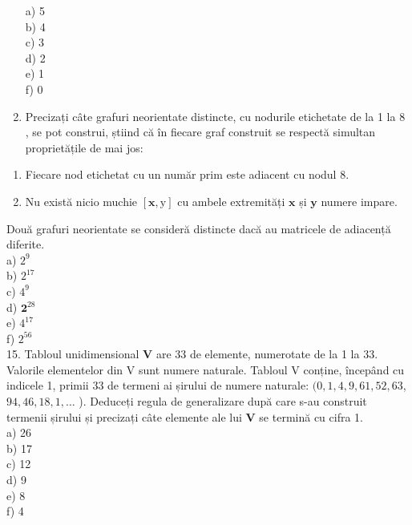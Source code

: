 \begin{enumerate}
a) 5\\
b) 4\\
c) 3\\
d) 2\\
e) 1\\
f) 0
  \item Precizați câte grafuri neorientate distincte, cu nodurile etichetate de la 1 la 8 , se pot construi, știind că în fiecare graf construit se respectă simultan proprietățile de mai jos:
\end{enumerate}

\begin{enumerate}
  \item Fiecare nod etichetat cu un număr prim este adiacent cu nodul 8.
  \item Nu există nicio muchie $[\mathbf{x}, \mathrm{y}]$ cu ambele extremități $\mathbf{x}$ și $\mathbf{y}$ numere impare.
\end{enumerate}

Două grafuri neorientate se consideră distincte dacă au matricele de adiacență diferite.\\
a) $2^{9}$\\
b) $2^{17}$\\
c) $4^{9}$\\
d) $\mathbf{2}^{28}$\\
e) $4^{17}$\\
f) $2^{56}$\\
15. Tabloul unidimensional $\mathbf{V}$ are 33 de elemente, numerotate de la 1 la 33. Valorile elementelor din V sunt numere naturale. Tabloul V conține, începând cu indicele 1, primii 33 de termeni ai șirului de numere naturale: $(0,1,4,9,61,52,63$, $94,46,18,1, \ldots$ ). Deduceți regula de generalizare după care s-au construit termenii șirului și precizați câte elemente ale lui $\mathbf{V}$ se termină cu cifra 1.\\
a) 26\\
b) 17\\
c) 12\\
d) 9\\
e) 8\\
f) 4

